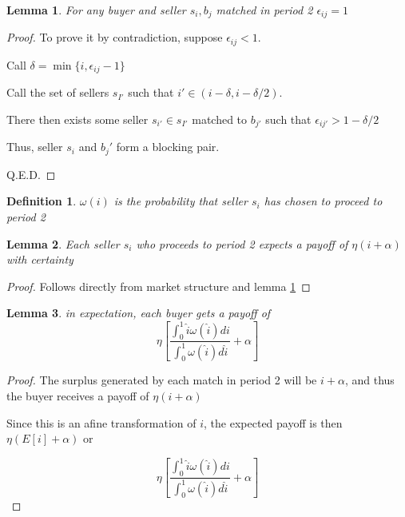 \documentclass[WP]{AEA}
\newtheorem{lemma}{Lemma}
\newtheorem{deff}{Definition}
\begin{document}
\begin{lemma} \label{lemma:e_1}
For any buyer and seller ${s_i, b_j}$ matched in period 2  $\epsilon_{ij} = 1$
\end{lemma}
\begin{proof}
	To prove it by contradiction, suppose $\epsilon_{ij} < 1$.
	
	Call $\delta = \min{\{i, \epsilon_{ij}- 1\}}$
	
	Call the set of sellers $s_{I'}$ such that $i' \in (i-\delta, i-\delta / 2)$.
	
	There then exists some seller $s_{i'} \in s_{I'}$ matched to $b_{j'}$ such that $\epsilon_{ij'} > 1-\delta / 2$ 
	
	Thus, seller $s_i$ and $b_j'$ form a blocking pair.
	
	Q.E.D.
\end{proof}

\begin{deff}
	$\omega(i) $ is the probability that seller $s_i$ has chosen to proceed to period 2

\end{deff}

\begin{lemma}
	Each seller $s_i$ who proceeds to period 2 expects a payoff of $\eta (i+\alpha)$ with certainty

\end{lemma}

\begin{proof}
	Follows directly from market structure and lemma \ref{lemma:e_1}
\end{proof}

\begin{lemma}
	in expectation, each buyer gets a payoff of 
	\begin{equation} \label{eq:E_buyer}
		\eta  \left[ \frac{\int_0^1 \hat{i} \omega(\hat{i}) di}{\int_0^1  \omega(\hat{i}) d\hat{i} } + \alpha \right]
	\end{equation}
\end{lemma}

\begin{proof}
	The surplus generated by each match in period 2 will be $i + \alpha$, and thus 
	the buyer receives a payoff of $\eta(i+\alpha)$
	
	Since this is an afine transformation of $i$, the expected payoff is then $\eta(E[i]+\alpha)$ or 



$$\eta \left[ \frac{\int_0^1 \hat{i} \omega(\hat{i}) di}{\int_0^1  \omega(\hat{i}) d\hat{i}} + \alpha \right] $$


\end{proof}
\end{document}
